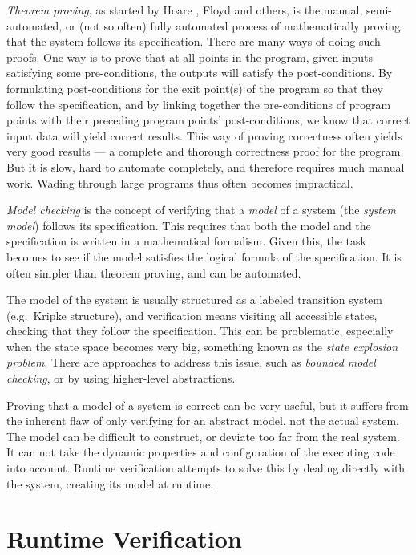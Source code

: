 \textit{Theorem proving}, as started by Hoare \cite{hoare69}, Floyd
\cite{floyd67} and others, is the manual, semi-automated, or (not so often)
fully automated process of mathematically proving that the system follows its
specification. There are many ways of doing such proofs. One way is to prove
that at all points in the program, given inputs satisfying some pre-conditions,
the outputs will satisfy the post-conditions. By formulating post-conditions
for the exit point(s) of the program so that they follow the specification, and
by linking together the pre-conditions of program points with their preceding
program points' post-conditions, we know that correct input data will yield
correct results. This way of proving correctness often yields very good results
--- a complete and thorough correctness proof for the program. But it is slow,
hard to automate completely, and therefore requires much manual work.  Wading
through large programs thus often becomes impractical.

\textit{Model checking} is the concept of verifying that a \textit{model} of a
system (the \textit{system model}) follows its specification. This requires
that both the model and the specification is written in a mathematical
formalism. Given this, the task becomes to see if the model satisfies the
logical formula of the specification. It is often simpler than theorem proving,
and can be automated.

The model of the system is usually structured as a labeled transition system
(e.g.\ Kripke structure), and verification means visiting all accessible
states, checking that they follow the specification. This can be problematic,
especially when the state space becomes very big, something known as the
\textit{state explosion problem}. There are approaches to address this issue,
such as \textit{bounded model checking}, or by using higher-level abstractions.

Proving that a model of a system is correct can be very useful, but it suffers
from the inherent flaw of only verifying for an abstract model, not the actual
system. The model can be difficult to construct, or deviate too far from the
real system. It can not take the dynamic properties and configuration of the
executing code into account. Runtime verification attempts to solve this by
dealing directly with the system, creating its model at runtime.


\section{Runtime Verification} \label{section-rv}

